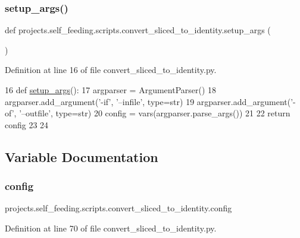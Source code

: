 \mbox{\label{namespaceprojects_1_1self__feeding_1_1scripts_1_1convert__sliced__to__identity_aea494b2057e7cfdbd2ecd268327400c4}} 
\subsubsection{\texorpdfstring{setup\+\_\+args()}{setup\_args()}}
{\footnotesize\ttfamily def projects.\+self\+\_\+feeding.\+scripts.\+convert\+\_\+sliced\+\_\+to\+\_\+identity.\+setup\+\_\+args (\begin{DoxyParamCaption}{ }\end{DoxyParamCaption})}



Definition at line 16 of file convert\+\_\+sliced\+\_\+to\+\_\+identity.\+py.


\begin{DoxyCode}
16 \textcolor{keyword}{def }\hyperlink{namespaceprojects_1_1self__feeding_1_1scripts_1_1convert__sliced__to__identity_aea494b2057e7cfdbd2ecd268327400c4}{setup\_args}():
17     argparser = ArgumentParser()
18     argparser.add\_argument(\textcolor{stringliteral}{'-if'}, \textcolor{stringliteral}{'--infile'}, type=str)
19     argparser.add\_argument(\textcolor{stringliteral}{'-of'}, \textcolor{stringliteral}{'--outfile'}, type=str)
20     config = vars(argparser.parse\_args())
21 
22     \textcolor{keywordflow}{return} config
23 
24 
\end{DoxyCode}


\subsection{Variable Documentation}
\mbox{\label{namespaceprojects_1_1self__feeding_1_1scripts_1_1convert__sliced__to__identity_a33616a4dd26d8519ee4fcde480fc5fc2}} 
\subsubsection{\texorpdfstring{config}{config}}
{\footnotesize\ttfamily projects.\+self\+\_\+feeding.\+scripts.\+convert\+\_\+sliced\+\_\+to\+\_\+identity.\+config}



Definition at line 70 of file convert\+\_\+sliced\+\_\+to\+\_\+identity.\+py.

